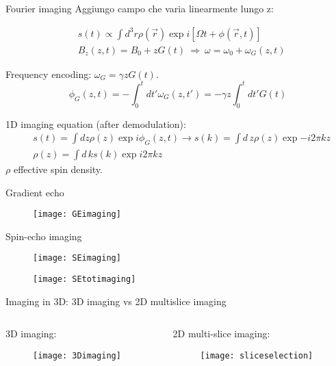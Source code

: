 \begin{frame}{Fourier imaging}
Aggiungo campo che varia linearmente lungo z:

\begin{align*}
&s(t)\propto\int d^3 r\rho(\vec{r})\exp{i[\Omega t+\phi(\vec{r},t)]}\\
&B_z(z,t)=B_0+zG(t)\ \Rightarrow\ \omega=\omega_0+\omega_G(z,t)
\end{align*}

Frequency encoding: $\omega_G=\gamma zG(t)$.
\begin{equation*}
\phi_G(z,t)=-\int_0^td t'\omega_G(z,t')=-\gamma z\int_0^td t'G(t)
\end{equation*}

1D imaging equation (after demodulation):
\begin{align*}
&s(t)=\int d z\rho(z)\exp{i\phi_G(z,t)}\to s(k)=\int d\,z\rho(z)\exp{-i2\pi kz}\\
&\rho(z)=\int d\,ks(k)\exp{i2\pi kz}
\end{align*}
$\rho$ effective spin density.

\end{frame}

\begin{frame}{Gradient echo}
\begin{figure}[!ht]\texttt{[image: GEimaging]}\end{figure}
\end{frame}

\begin{frame}[allowframebreaks]{Spin-echo imaging}
\begin{figure}[!ht]\texttt{[image: SEimaging]}\end{figure}
\begin{figure}[!ht]\texttt{[image: SEtotimaging]}\end{figure}
\end{frame}

\begin{frame}[allowframebreaks]{Imaging in 3D: 3D imaging  vs 2D multislice imaging}
\begin{columns}[T]
\begin{column}{0.5\textwidth}
3D imaging:
\begin{figure}[!ht]\texttt{[image: 3Dimaging]}\label{fig:3Dimaging}\end{figure}
\end{column}
\begin{column}{0.49\textwidth}
2D multi-slice imaging:
\begin{figure}[!ht]\texttt{[image: sliceselection]}\label{fig:sliceselection}\end{figure}
\end{column}
\end{columns}
\end{frame}

